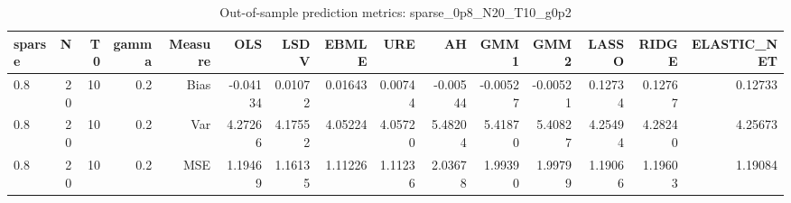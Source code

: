 \begin{table}[!htbp]\centering
\caption{Out-of-sample prediction metrics: sparse_0p8_N20_T10_g0p2}
\label{tab:table3_sparse_0p8_N20_T10_g0p2}
\begin{tabular}{lrrrrrrrrrrrrrr}
\hline
sparse & N & T0 & gamma & Measure & OLS & LSDV & EBMLE & URE & AH & GMM1 & GMM2 & LASSO & RIDGE & ELASTIC_NET \\
\hline
0.8 & 20 & 10 & 0.2 & Bias & -0.04134 & 0.01072 & 0.01643 & 0.00744 & -0.00544 & -0.00527 & -0.00521 & 0.12734 & 0.12767 & 0.12733 \\
0.8 & 20 & 10 & 0.2 & Var & 4.27266 & 4.17552 & 4.05224 & 4.05720 & 5.48204 & 5.41870 & 5.40827 & 4.25494 & 4.28240 & 4.25673 \\
0.8 & 20 & 10 & 0.2 & MSE & 1.19469 & 1.16135 & 1.11226 & 1.11236 & 2.03678 & 1.99390 & 1.99799 & 1.19066 & 1.19603 & 1.19084 \\
\hline
\end{tabular}
\end{table}

